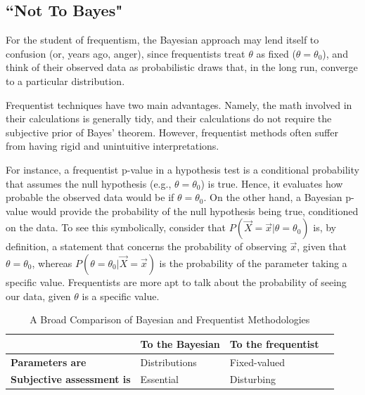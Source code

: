\documentclass[12pt,twoside]{reedthesis}
\begin{document}
	\subsection*{``Not To Bayes"}
	For the student of frequentism, the Bayesian approach may lend itself to confusion (or, years ago, anger), since frequentists treat $\theta$ as fixed ($\theta = \theta_0$), and think of their observed data as probabilistic draws that, in the long run, converge to a particular distribution.
	
	Frequentist techniques have two main advantages. Namely, the math involved in their calculations is generally tidy, and their calculations do not require the subjective prior of Bayes' theorem. However, frequentist methods often suffer from having rigid and unintuitive interpretations. 
	
	For instance, a frequentist p-value in a hypothesis test is a conditional probability that assumes the null hypothesis (e.g., $\theta = \theta_0$) is true. Hence, it evaluates how probable the observed data would be if $\theta = \theta_0$. On the other hand, a Bayesian p-value would provide the probability of the null hypothesis being true, conditioned on the data. 
	To see this symbolically, consider that $P(\vec{X} = \vec{x} | \theta = \theta_0 )$ is, by definition, a statement that concerns the probability of observing $\vec{x}$, given that $\theta = \theta_0$, whereas $P(\theta = \theta_0 | \vec{X} = \vec{x})$ is the probability of the parameter taking a specific value. Frequentists are more apt to talk about the probability of seeing our data, given $\theta$ is a specific value.

\begin{table}[htdp] %
\caption[Comparison of Bayesian and Frequentist Reasoning]{A Broad Comparison of Bayesian and Frequentist Methodologies} 
\begin{center}
\begin{tabular}{l l l l} 

   &  \textbf{To the Bayesian} & \textbf{To the frequentist} \\ %
  \midrule %
\textbf{Parameters are} & Distributions  & Fixed-valued \\ %
\textbf{Subjective assessment is} & Essential & Disturbing \\
\bottomrule %
\end{tabular}
\end{center}
\label{bvf} %
\end{table}
\end{document}
